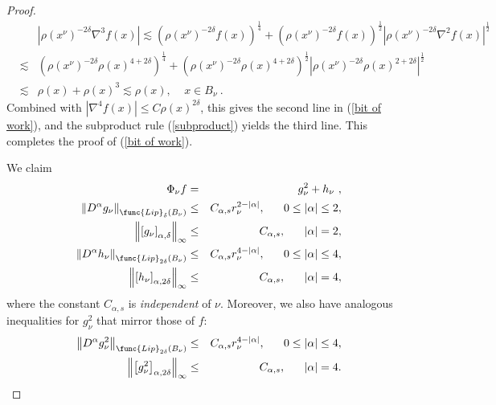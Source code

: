 \documentclass{amsart}
\theoremstyle{plain}
\numberwithin{equation}{section}
\begin{document}
\begin{proof}
\begin{eqnarray*}
&&\left\vert \rho \left( x^{\nu }\right) ^{-2\delta }\nabla ^{3}f\left(
x\right) \right\vert \lesssim \left( \rho \left( x^{\nu }\right) ^{-2\delta
}f\left( x\right) \right) ^{\frac{1}{4}}+\left( \rho \left( x^{\nu }\right)
^{-2\delta }f\left( x\right) \right) ^{\frac{1}{2}}\left\vert \rho \left(
x^{\nu }\right) ^{-2\delta }\nabla ^{2}f\left( x\right) \right\vert ^{\frac{1%
}{2}} \\
&\lesssim &\left( \rho \left( x^{\nu }\right) ^{-2\delta }\rho \left(
x\right) ^{4+2\delta }\right) ^{\frac{1}{4}}+\left( \rho \left( x^{\nu
}\right) ^{-2\delta }\rho \left( x\right) ^{4+2\delta }\right) ^{\frac{1}{2}%
}\left\vert \rho \left( x^{\nu }\right) ^{-2\delta }\rho \left( x\right)
^{2+2\delta }\right\vert ^{\frac{1}{2}} \\
&\lesssim &\rho \left( x\right) +\rho \left( x\right) ^{3}\lesssim \rho
\left( x\right) ,\ \ \ \ \ x\in B_{\nu }\ .
\end{eqnarray*}%
Combined with $\left\vert \nabla ^{4}f\left( x\right) \right\vert \leq C\rho
\left( x\right) ^{2\delta }$, this gives the second line in (\ref{bit of
work}), and the subproduct rule (\ref{subproduct}) yields the third line.
This completes the proof of (\ref{bit of work}).

We claim 
\begin{eqnarray*}
\Phi _{\nu }f &=&g_{\nu }^{2}+h_{\nu }\ , \\
\left\Vert D^{\alpha }g_{\nu }\right\Vert _{\func{Lip}_{\delta }\left(
B_{\nu }\right) } &\leq &C_{\alpha ,s}r_{\nu }^{2-\left\vert \alpha
\right\vert },\ \ \ \ \ 0\leq \left\vert \alpha \right\vert \leq 2, \\
\left\Vert \left[ g_{\nu }\right] _{\alpha ,\delta }\right\Vert _{\infty }
&\leq &C_{\alpha ,s},\ \ \ \ \ \left\vert \alpha \right\vert =2, \\
\left\Vert D^{\alpha }h_{\nu }\right\Vert _{\func{Lip}_{2\delta }\left(
B_{\nu }\right) } &\leq &C_{\alpha ,s}r_{\nu }^{4-\left\vert \alpha
\right\vert },\ \ \ \ \ 0\leq \left\vert \alpha \right\vert \leq 4, \\
\left\Vert \left[ h_{\nu }\right] _{\alpha ,2\delta }\right\Vert _{\infty }
&\leq &C_{\alpha ,s},\ \ \ \ \ \left\vert \alpha \right\vert =4,
\end{eqnarray*}%
where the constant $C_{\alpha ,s}$ is \emph{independent} of $\nu $.
Moreover, we also have analogous inequalities for $g_{\nu }^{2}$ that mirror
those of $f$:%
\begin{eqnarray*}
\left\Vert D^{\alpha }g_{\nu }^{2}\right\Vert _{\func{Lip}_{2\delta }\left(
B_{\nu }\right) } &\leq &C_{\alpha ,s}r_{\nu }^{4-\left\vert \alpha
\right\vert },\ \ \ \ \ 0\leq \left\vert \alpha \right\vert \leq 4, \\
\left\Vert \left[ g_{\nu }^{2}\right] _{\alpha ,2\delta }\right\Vert
_{\infty } &\leq &C_{\alpha ,s},\ \ \ \ \ \left\vert \alpha \right\vert =4.
\end{eqnarray*}


\end{proof}
\end{document}
